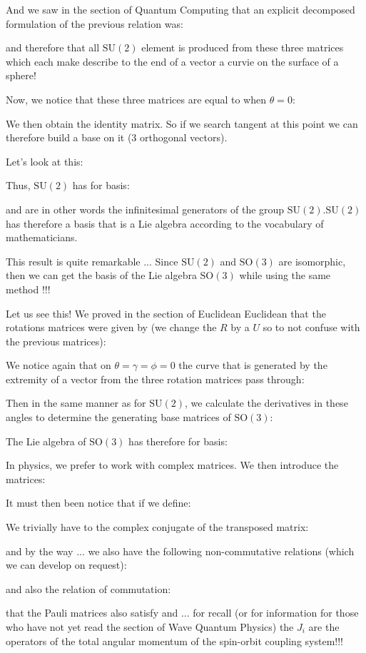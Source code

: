 	And we saw in the section of Quantum Computing that an explicit decomposed formulation of  the previous relation was:
	
	and therefore that all $\text{SU}(2)$ element is produced from these three matrices which each make describe to the end of a vector a curvie on the surface of a sphere!
	
	Now, we notice that these three matrices are equal to when $\theta=0$:
	
	We then obtain the identity matrix. So if we search tangent at this point we can therefore build a base on it ($3$ orthogonal vectors).
	
	Let's look at this:
	
	Thus, $\text{SU}(2)$ has for basis:
	
	and are in other words the infinitesimal generators of the group $\text{SU}(2)$.$\text{SU}(2)$ has therefore a basis that is a Lie algebra according to the vocabulary of mathematicians.
	
	This result is quite remarkable ... Since $\text{SU} (2)$ and $\text{SO} (3)$ are isomorphic, then we can get the basis of the Lie algebra $\text{SO} (3)$ while using the same method !!!
	
	Let us see this! We proved in the section of Euclidean Euclidean that the rotations matrices were given by (we change the $R$ by a $U$ so to not confuse with the previous matrices):
	
	We notice again that on 
$\theta=\gamma=\phi=0$ the curve that is generated by the extremity of a vector from the three rotation matrices pass through:
	
	Then in the same manner as for $\text{SU} (2)$, we calculate the derivatives in these angles to determine the generating base matrices of $\text{SO} (3)$:
	
	The Lie algebra of $\text{SO} (3)$ has therefore for basis:
	
	In physics, we prefer to work with complex matrices. We then introduce the matrices:
	
	It must then been notice that if we define:
	
	We trivially have to the complex conjugate of the transposed matrix:
	
	and by the way ... we also have the following non-commutative relations (which we can develop on request):
	
	and also the relation of commutation:
	
	that the Pauli matrices also satisfy and ... for recall (or for information for those who have not yet read the section of Wave Quantum Physics) the $J_i$ are the operators of the total angular momentum of the spin-orbit coupling system!!!
	
